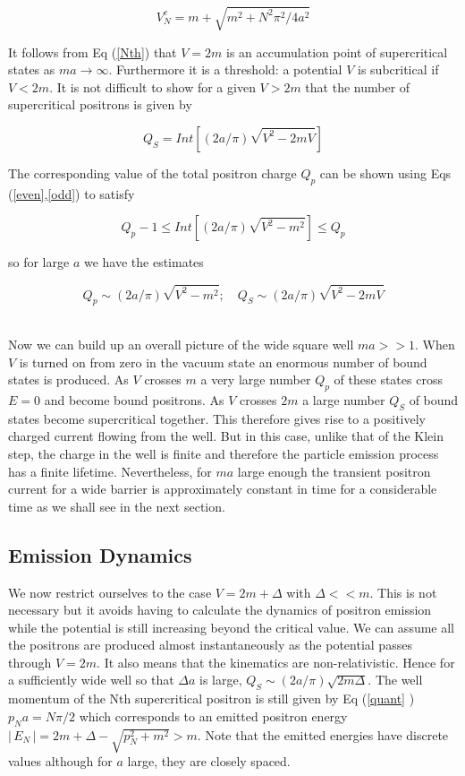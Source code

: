 \begin{equation}  \label{Nth}
V_N^c=m+\sqrt{m^2+N^2\pi ^2/4a^2}
\end{equation}

\noindent It follows from Eq (\ref{Nth}) that $V=2m$ is an accumulation
point of supercritical states as $ma\rightarrow \infty $. Furthermore it is
a threshold: a potential $V$ is subcritical if $V<2m$. It is not difficult
to show for a given $V>2m$ that the number of supercritical positrons is
given by

\begin{equation}  \label{super2}
Q_S=Int[(2a/\pi )\sqrt{V^2-2mV}]
\end{equation}

\noindent The corresponding value of the total positron charge $Q_p$ can be
shown using Eqs (\ref{even},\ref{odd}) to satisfy

\begin{equation}  \label{charge}
Q_p-1\leq Int[(2a/\pi )\sqrt{V^2-m^2}]\leq Q_p
\end{equation}

\noindent so for large $a$ we have the estimates

\begin{equation}  \label{est}
Q_p\sim (2a/\pi )\sqrt{V^2-m^2};\quad Q_S\sim (2a/\pi )\sqrt{V^2-2mV}
\end{equation}
$\qquad $

\noindent Now we can build up an overall picture of the wide square well $%
ma>>1$. When $V$ is turned on from zero in the vacuum state an enormous
number of bound states is produced. As $V$ crosses $m$ a very large number $%
Q_p$ of these states cross $E=0$ and become bound positrons. As $V$ crosses $%
2m$ a large number $Q_S$ of bound states become supercritical together. This
therefore gives rise to a positively charged current flowing from the well.
But in this case, unlike that of the Klein step, the charge in the well is
finite and therefore the particle emission process has a finite lifetime.
Nevertheless, for $ma$ large enough the transient positron current for a
wide barrier is approximately constant in time for a considerable time as we
shall see in the next section.\ 

\subsection{Emission Dynamics}

\noindent We now restrict ourselves to the case $V=2m+\Delta $ with $\Delta
<<m$. This is not necessary but it avoids having to calculate the dynamics
of positron emission while the potential is still increasing beyond the
critical value. We can assume all the positrons are produced almost
instantaneously as the potential passes through $V=2m.$ It also means that
the kinematics are non-relativistic. Hence for a sufficiently wide well so
that $\Delta a$ is large, $Q_S\sim (2a/\pi )\sqrt{2m\Delta }$. The well
momentum of the Nth supercritical positron is still given by Eq (\ref{quant}%
) $p_Na=N\pi /2$ which corresponds to an emitted positron energy $%
|\,E_N\,|=2m+\Delta -\sqrt{p_N^2+m^2}>m$. Note that the emitted energies
have discrete values although for $a$ large, they are closely spaced.

